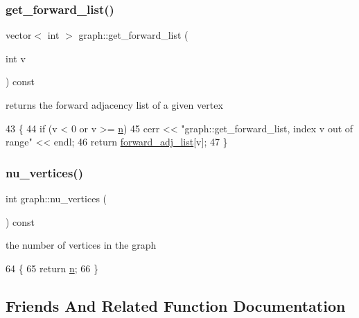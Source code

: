 \subsubsection{\texorpdfstring{get\+\_\+forward\+\_\+list()}{get\_forward\_list()}}
{\footnotesize\ttfamily vector$<$ int $>$ graph\+::get\+\_\+forward\+\_\+list (\begin{DoxyParamCaption}\item[{int}]{v }\end{DoxyParamCaption}) const}



returns the forward adjacency list of a given vertex 


\begin{DoxyCode}
43                                               \{
44   \textcolor{keywordflow}{if} (v < 0 or v >= \hyperlink{classgraph_ac8b3474ce95c04087c312508ec1443b6}{n})
45     cerr << \textcolor{stringliteral}{"graph::get\_forward\_list, index v out of range"} << endl;
46   \textcolor{keywordflow}{return} \hyperlink{classgraph_a7d6441850d586d6a99fb73df57b70362}{forward\_adj\_list}[v];
47 \}
\end{DoxyCode}
\mbox{\label{classgraph_a70a6e0e4e0a874ab122405abd38f83cd}} 
\subsubsection{\texorpdfstring{nu\+\_\+vertices()}{nu\_vertices()}}
{\footnotesize\ttfamily int graph\+::nu\+\_\+vertices (\begin{DoxyParamCaption}{ }\end{DoxyParamCaption}) const}



the number of vertices in the graph 


\begin{DoxyCode}
64                             \{
65   \textcolor{keywordflow}{return} \hyperlink{classgraph_ac8b3474ce95c04087c312508ec1443b6}{n};
66 \}
\end{DoxyCode}


\subsection{Friends And Related Function Documentation}
\mbox{\label{classgraph_a004e2b491d4bafaf2d8129e6bc8abc2e}} 
